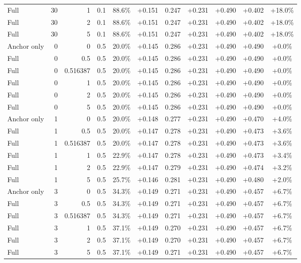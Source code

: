 \begin{table}[htbp]
\begin{tabular}{lrrrccccccc}
Full & 30 & 1 & 0.1 & 88.6\% & +0.151 & 0.247 & +0.231 & +0.490 & +0.402 & +18.0\% \\
Full & 30 & 2 & 0.1 & 88.6\% & +0.151 & 0.247 & +0.231 & +0.490 & +0.402 & +18.0\% \\
Full & 30 & 5 & 0.1 & 88.6\% & +0.151 & 0.247 & +0.231 & +0.490 & +0.402 & +18.0\% \\
Anchor only & 0 & 0 & 0.5 & 20.0\% & +0.145 & 0.286 & +0.231 & +0.490 & +0.490 & +0.0\% \\
Full & 0 & 0.5 & 0.5 & 20.0\% & +0.145 & 0.286 & +0.231 & +0.490 & +0.490 & +0.0\% \\
Full & 0 & 0.516387 & 0.5 & 20.0\% & +0.145 & 0.286 & +0.231 & +0.490 & +0.490 & +0.0\% \\
Full & 0 & 1 & 0.5 & 20.0\% & +0.145 & 0.286 & +0.231 & +0.490 & +0.490 & +0.0\% \\
Full & 0 & 2 & 0.5 & 20.0\% & +0.145 & 0.286 & +0.231 & +0.490 & +0.490 & +0.0\% \\
Full & 0 & 5 & 0.5 & 20.0\% & +0.145 & 0.286 & +0.231 & +0.490 & +0.490 & +0.0\% \\
Anchor only & 1 & 0 & 0.5 & 20.0\% & +0.148 & 0.277 & +0.231 & +0.490 & +0.470 & +4.0\% \\
Full & 1 & 0.5 & 0.5 & 20.0\% & +0.147 & 0.278 & +0.231 & +0.490 & +0.473 & +3.6\% \\
Full & 1 & 0.516387 & 0.5 & 20.0\% & +0.147 & 0.278 & +0.231 & +0.490 & +0.473 & +3.6\% \\
Full & 1 & 1 & 0.5 & 22.9\% & +0.147 & 0.278 & +0.231 & +0.490 & +0.473 & +3.4\% \\
Full & 1 & 2 & 0.5 & 22.9\% & +0.147 & 0.279 & +0.231 & +0.490 & +0.474 & +3.2\% \\
Full & 1 & 5 & 0.5 & 25.7\% & +0.146 & 0.281 & +0.231 & +0.490 & +0.480 & +2.0\% \\
Anchor only & 3 & 0 & 0.5 & 34.3\% & +0.149 & 0.271 & +0.231 & +0.490 & +0.457 & +6.7\% \\
Full & 3 & 0.5 & 0.5 & 34.3\% & +0.149 & 0.271 & +0.231 & +0.490 & +0.457 & +6.7\% \\
Full & 3 & 0.516387 & 0.5 & 34.3\% & +0.149 & 0.271 & +0.231 & +0.490 & +0.457 & +6.7\% \\
Full & 3 & 1 & 0.5 & 37.1\% & +0.149 & 0.270 & +0.231 & +0.490 & +0.457 & +6.7\% \\
Full & 3 & 2 & 0.5 & 37.1\% & +0.149 & 0.270 & +0.231 & +0.490 & +0.457 & +6.7\% \\
Full & 3 & 5 & 0.5 & 37.1\% & +0.149 & 0.271 & +0.231 & +0.490 & +0.457 & +6.7\% \\

\end{tabular}
\end{table}
